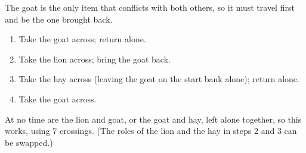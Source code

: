 The goat is the only item that conflicts with both others, so it must travel first and be the one brought back.
\begin{enumerate}
\item Take the goat across; return alone.
\item Take the lion across; bring the goat back.
\item Take the hay across (leaving the goat on the start bank alone); return alone.
\item Take the goat across.
\end{enumerate}
At no time are the lion and goat, or the goat and hay, left alone together, so this works, using $7$ crossings. (The roles of the lion and the hay in steps 2 and 3 can be swapped.)
